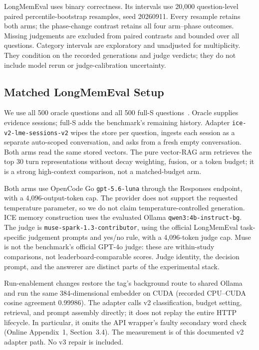 \documentclass[twoside,11pt]{article}
\begin{document}
LongMemEval uses binary correctness. Its intervals use 20,000 question-level paired percentile-bootstrap resamples, seed 20260911. Every resample retains both arms; the phase-change contrast retains all four arm--phase outcomes. Missing judgements are excluded from paired contrasts and bounded over all questions. Category intervals are exploratory and unadjusted for multiplicity. They condition on the recorded generations and judge verdicts; they do not include model rerun or judge-calibration uncertainty.

\subsection{Matched LongMemEval Setup}
\label{sec:lme-setup}
We use all 500 oracle questions and all 500 full-S questions~\citep{wu2025longmemeval}. Oracle supplies evidence sessions; full-S adds the benchmark's remaining history. Adapter \texttt{ice-v2-lme-sessions-v2} wipes the store per question, ingests each session as a separate auto-scoped conversation, and asks from a fresh empty conversation. Both arms read the same stored vectors. The pure vector-RAG arm retrieves the top 30 turn representations without decay weighting, fusion, or a token budget; it is a strong high-context comparison, not a matched-budget arm.

Both arms use OpenCode Go \texttt{gpt-5.6-luna} through the Responses endpoint, with a 4,096-output-token cap. The provider does not support the requested temperature parameter, so we do not claim temperature-controlled generation. ICE memory construction uses the evaluated Ollama \texttt{qwen3:4b-instruct-bg}. The judge is \texttt{muse-spark-1.3-contributor}, using the official LongMemEval task-specific judgement prompts and yes/no rule, with a 4,096-token judge cap. Muse is not the benchmark's official GPT-4o judge: these are within-study comparisons, not leaderboard-comparable scores. Judge identity, the decision prompt, and the answerer are distinct parts of the experimental stack.

Run-enablement changes restore the tag's background route to shared Ollama and run the same 384-dimensional embedder on CUDA (recorded CPU--CUDA cosine agreement 0.99986). The adapter calls v2 classification, budget setting, retrieval, and prompt assembly directly; it does not replay the entire HTTP lifecycle. In particular, it omits the API wrapper's faulty secondary word check (Online Appendix~1, Section~3.4). The measurement is of this documented v2 adapter path. No v3 repair is included.
\end{document}
